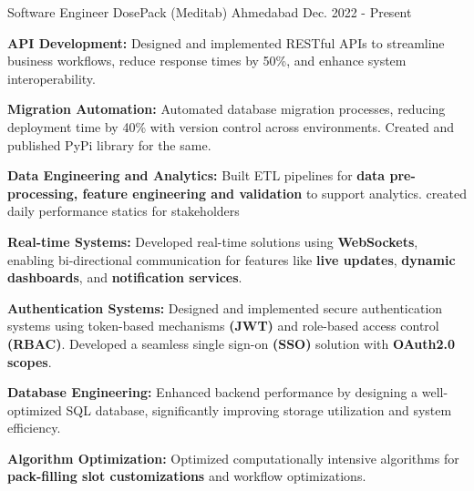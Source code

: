 
\begin{cventries}

  \cventry
    {Software Engineer} %
    {DosePack (Meditab)} %
    {Ahmedabad} %
    {Dec. 2022 - Present} %
    {
      \begin{cvitems} %
        \item \textbf{API Development:} Designed and implemented RESTful APIs to streamline business workflows, reduce response times by 50\%, and enhance system interoperability.
        \vspace{0.4em}
        \item \textbf{Migration Automation:} Automated database migration processes, reducing deployment time by 40\% with version control across environments. Created and published PyPi library for the same.
        \item \textbf{Data Engineering and Analytics:} Built ETL pipelines for \textbf{ data pre-processing, feature engineering and validation} to support analytics. created daily performance statics for stakeholders 
        \vspace{0.4em}
        \item \textbf{Real-time Systems:} Developed real-time solutions using \textbf{WebSockets}, enabling bi-directional communication for features like \textbf{live updates}, \textbf{dynamic dashboards}, and \textbf{notification services}.
        \vspace{0.4em}
        \item \textbf{Authentication Systems:} Designed and implemented secure authentication systems using token-based mechanisms \textbf{(JWT)} and role-based access control \textbf{(RBAC)}. Developed a seamless single sign-on \textbf{(SSO)} solution with \textbf{OAuth2.0 scopes}.
        \vspace{0.4em}
        \item \textbf{Database Engineering:} Enhanced backend performance by designing a well-optimized SQL database, significantly improving storage utilization and system efficiency.
        \vspace{0.4em}
        \item \textbf{Algorithm Optimization:} Optimized computationally intensive algorithms for \textbf{pack-filling slot customizations} and workflow optimizations.
      \end{cvitems}
    }


\end{cventries}
